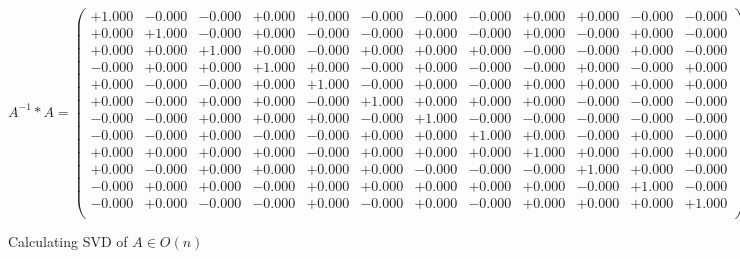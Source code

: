 \documentclass[9pt]{article}
\theoremstyle{plain}
\theoremstyle{definition}
\theoremstyle{remark}
\numberwithin{equation}{section}
\begin{document}
$A^{-1} *A = \left(
\begin{array}{
cccccccccccc}
+1.000 & -0.000 & -0.000 & +0.000 & +0.000 & -0.000 & -0.000 & -0.000 & +0.000 & +0.000 & -0.000 & -0.000 \\
+0.000 & +1.000 & -0.000 & +0.000 & -0.000 & -0.000 & +0.000 & -0.000 & +0.000 & -0.000 & +0.000 & -0.000 \\
+0.000 & +0.000 & +1.000 & +0.000 & -0.000 & +0.000 & +0.000 & +0.000 & -0.000 & -0.000 & +0.000 & -0.000 \\
-0.000 & +0.000 & +0.000 & +1.000 & +0.000 & -0.000 & +0.000 & -0.000 & -0.000 & +0.000 & -0.000 & +0.000 \\
+0.000 & -0.000 & -0.000 & +0.000 & +1.000 & -0.000 & +0.000 & -0.000 & +0.000 & +0.000 & +0.000 & +0.000 \\
+0.000 & -0.000 & +0.000 & +0.000 & -0.000 & +1.000 & +0.000 & +0.000 & +0.000 & -0.000 & -0.000 & -0.000 \\
-0.000 & -0.000 & +0.000 & +0.000 & +0.000 & -0.000 & +1.000 & -0.000 & -0.000 & -0.000 & -0.000 & -0.000 \\
-0.000 & -0.000 & +0.000 & -0.000 & -0.000 & +0.000 & +0.000 & +1.000 & +0.000 & -0.000 & +0.000 & -0.000 \\
+0.000 & +0.000 & +0.000 & +0.000 & -0.000 & +0.000 & +0.000 & +0.000 & +1.000 & +0.000 & +0.000 & +0.000 \\
+0.000 & -0.000 & +0.000 & +0.000 & +0.000 & +0.000 & -0.000 & -0.000 & -0.000 & +1.000 & +0.000 & -0.000 \\
-0.000 & +0.000 & +0.000 & -0.000 & +0.000 & +0.000 & +0.000 & +0.000 & +0.000 & -0.000 & +1.000 & -0.000 \\
-0.000 & +0.000 & -0.000 & -0.000 & +0.000 & -0.000 & +0.000 & -0.000 & +0.000 & +0.000 & +0.000 & +1.000 \\
\end{array}
\right)$ \newline 

Calculating SVD of  $A \in O(n)$
\end{document}
